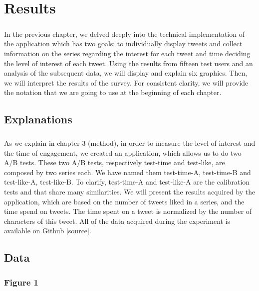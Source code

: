 \chapter{Results}

\paragraph{}
In the previous chapter, we delved deeply into the technical implementation of the application which has two goals: to individually display tweets and collect information on the series regarding the interest for each tweet and time deciding the level of interest of each tweet. Using the results from fifteen test users and an analysis of the subsequent data, we will display and explain six graphics. Then, we will interpret the results of the survey. For consistent clarity, we will provide the notation that we are going to use at the beginning of each chapter.

\section{Explanations}

\paragraph{}
As we explain in chapter 3 (method), in order to measure the level of interest and the time of engagement, we created an application, which allows us to do two A/B tests. These two A/B tests, respectively test-time and test-like, are composed by two series each. We have named them test-time-A, test-time-B and test-like-A, test-like-B. To clarify, test-time-A and test-like-A are the calibration tests and that share many similarities. We will present the results acquired by the application, which are based on the number of tweets liked in a series, and the time spend on tweets. The time spent on a tweet is normalized by the number of characters of this tweet. All of the data acquired during the experiment is available on Github [source].

\section{Data}

\subsection{Figure 1}

